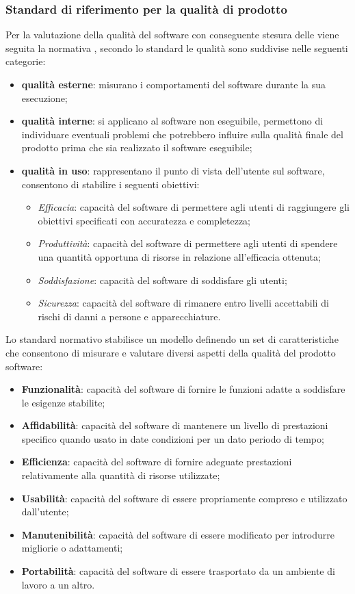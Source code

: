 \subsubsection{Standard di riferimento per la qualità di prodotto}
\label{subsubsec:standard_normativo}
Per la valutazione della qualità del software con conseguente stesura delle  viene seguita la normativa , secondo lo standard le qualità sono suddivise nelle seguenti categorie:
\begin{itemize}
    \item \textbf{qualità esterne}: misurano i comportamenti del software durante la sua esecuzione;
    \item \textbf{qualità interne}: si applicano al software non eseguibile, permettono di individuare eventuali problemi che potrebbero influire sulla qualità finale del prodotto prima che sia realizzato il software eseguibile;
    \item \textbf{qualità in uso}: rappresentano il punto di vista dell'utente sul software, consentono di stabilire i seguenti obiettivi:
    \begin{itemize}
        \item \textit{Efficacia}: capacità del software di permettere agli utenti di raggiungere gli obiettivi specificati con accuratezza e completezza;
        \item \textit{Produttività}: capacità del software di permettere agli utenti di spendere una quantità opportuna di risorse in relazione all'efficacia ottenuta;
        \item \textit{Soddisfazione}: capacità del software di soddisfare gli utenti;
        \item \textit{Sicurezza}: capacità del software di rimanere entro livelli accettabili di rischi di danni a persone e apparecchiature.
    \end{itemize}
\end{itemize}
Lo standard normativo stabilisce un modello definendo un set di caratteristiche che consentono di misurare e valutare diversi aspetti della qualità del prodotto software:
\begin{itemize}
    \item \textbf{Funzionalità}: capacità del software di fornire le funzioni adatte a soddisfare le esigenze stabilite;
    \item \textbf{Affidabilità}: capacità del software di mantenere un livello di prestazioni specifico quando usato in date condizioni per un dato periodo di tempo;
    \item \textbf{Efficienza}: capacità del software di fornire adeguate prestazioni relativamente alla quantità di risorse utilizzate;
    \item \textbf{Usabilità}: capacità del software di essere propriamente compreso e utilizzato dall'utente;
    \item \textbf{Manutenibilità}: capacità del software di essere modificato per introdurre migliorie o adattamenti;
    \item \textbf{Portabilità}: capacità del software di essere trasportato da un ambiente di lavoro a un altro.
\end{itemize}

